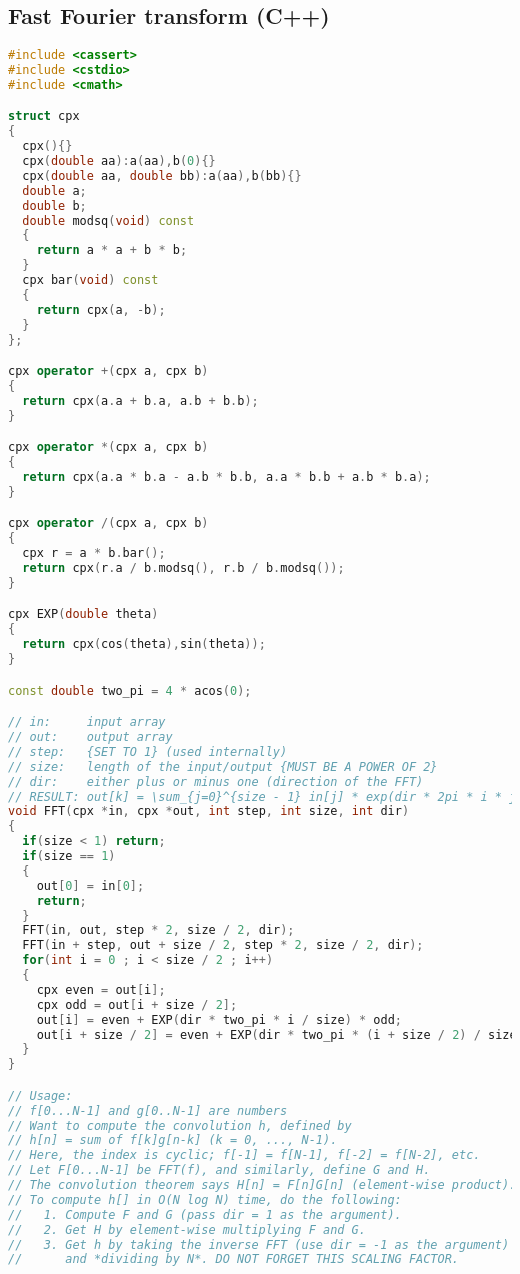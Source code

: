 \subsection{Fast Fourier transform (C++)}
\begin{lstlisting}[language=C++]
#include <cassert>
#include <cstdio>
#include <cmath>

struct cpx
{
  cpx(){}
  cpx(double aa):a(aa),b(0){}
  cpx(double aa, double bb):a(aa),b(bb){}
  double a;
  double b;
  double modsq(void) const
  {
    return a * a + b * b;
  }
  cpx bar(void) const
  {
    return cpx(a, -b);
  }
};

cpx operator +(cpx a, cpx b)
{
  return cpx(a.a + b.a, a.b + b.b);
}

cpx operator *(cpx a, cpx b)
{
  return cpx(a.a * b.a - a.b * b.b, a.a * b.b + a.b * b.a);
}

cpx operator /(cpx a, cpx b)
{
  cpx r = a * b.bar();
  return cpx(r.a / b.modsq(), r.b / b.modsq());
}

cpx EXP(double theta)
{
  return cpx(cos(theta),sin(theta));
}

const double two_pi = 4 * acos(0);

// in:     input array
// out:    output array
// step:   {SET TO 1} (used internally)
// size:   length of the input/output {MUST BE A POWER OF 2}
// dir:    either plus or minus one (direction of the FFT)
// RESULT: out[k] = \sum_{j=0}^{size - 1} in[j] * exp(dir * 2pi * i * j * k / size)
void FFT(cpx *in, cpx *out, int step, int size, int dir)
{
  if(size < 1) return;
  if(size == 1)
  {
    out[0] = in[0];
    return;
  }
  FFT(in, out, step * 2, size / 2, dir);
  FFT(in + step, out + size / 2, step * 2, size / 2, dir);
  for(int i = 0 ; i < size / 2 ; i++)
  {
    cpx even = out[i];
    cpx odd = out[i + size / 2];
    out[i] = even + EXP(dir * two_pi * i / size) * odd;
    out[i + size / 2] = even + EXP(dir * two_pi * (i + size / 2) / size) * odd;
  }
}

// Usage:
// f[0...N-1] and g[0..N-1] are numbers
// Want to compute the convolution h, defined by
// h[n] = sum of f[k]g[n-k] (k = 0, ..., N-1).
// Here, the index is cyclic; f[-1] = f[N-1], f[-2] = f[N-2], etc.
// Let F[0...N-1] be FFT(f), and similarly, define G and H.
// The convolution theorem says H[n] = F[n]G[n] (element-wise product).
// To compute h[] in O(N log N) time, do the following:
//   1. Compute F and G (pass dir = 1 as the argument).
//   2. Get H by element-wise multiplying F and G.
//   3. Get h by taking the inverse FFT (use dir = -1 as the argument)
//      and *dividing by N*. DO NOT FORGET THIS SCALING FACTOR.


\end{lstlisting}
